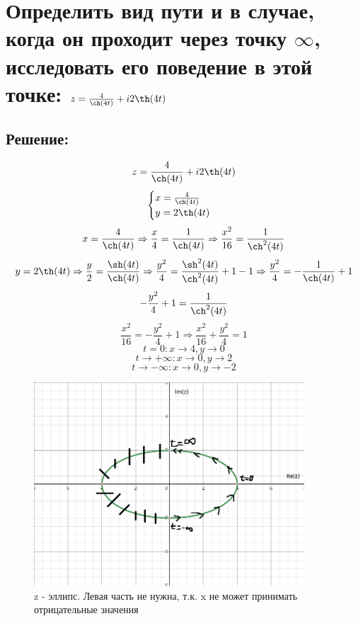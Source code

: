 \documentclass{article}
\begin{document}
	
	
	
	\section{Определить вид пути и в случае, когда он проходит через точку $\infty$, исследовать его поведение в этой точке: $z = \frac{4}{\ch(4t)} + i2\th(4t)$}
	\subsection{Решение:}
	\[z = \frac{4}{\ch(4t)} + i2\th(4t)\]
	\[\begin{cases}
		x = \frac{4}{\ch(4t)} \\
		y = 2 \th(4t)
	\end{cases}\]
	\[x= \frac{4}{\ch (4t)} \Rightarrow \frac{x}{4} = \frac{1}{\ch (4t)} \Rightarrow \frac{x^2}{16} = \frac{1}{\ch^2 (4t)}\]
	\[y = 2 \th(4t) \Rightarrow \frac{y}{2} = \frac{\sh(4t)}{\ch(4t)} \Rightarrow\frac{y^2}{4} = \frac{\sh^2(4t)}{\ch^2(4t)} + 1 -1 \Rightarrow\frac{y^2}{4} = -\frac{1}{\ch(4t)}+1\]
	\[-\frac{y^2}{4} + 1 = \frac{1}{\ch^2(4t)}\]
	\[\frac{x^2}{16} = -\frac{y^2}{4} + 1 \Rightarrow \frac{x^2}{16} + \frac{y^2}{4} = 1\]
	\[t =0 : x \rightarrow 4, y \rightarrow 0\]
	\[t \rightarrow +\infty : x \rightarrow 0, y \rightarrow 2\]
	\[t \rightarrow -\infty : x \rightarrow 0, y \rightarrow -2\]
	
	
	\begin{figure}[h]
		\centering
		\includegraphics[width= 0.9\textwidth]	{7.png}
		\caption{z - эллипс. Левая часть не нужна, т.к. x не может принимать отрицательные значения}
		\label{fig:your_label}
	\end{figure}
	
\end{document}
